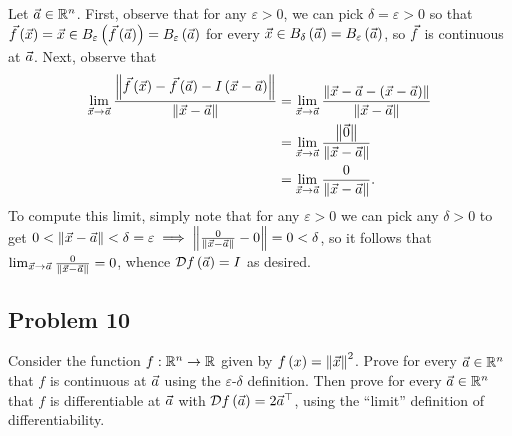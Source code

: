 \documentclass[main.tex]{subfiles}
\begin{document}
\begin{soln}
    Let $\vec{a}\in \mathbb R^n$. First, observe that for any $\varepsilon > 0$, we can pick $\delta = \varepsilon > 0$ so that $\vec{f}\left( \vec{x} \right) = \vec{x}\in B_\varepsilon\left( \vec{f}\left( \vec{a} \right) \right) = B_\varepsilon\left( \vec{a} \right)$ for every $\vec{x}\in B_\delta\left( \vec{a} \right) = B_\varepsilon\left( \vec{a} \right)$, so $\vec{f}$ is continuous at $\vec{a}$. Next, observe that
    \begin{align*}
    \lim_{\vec{x}\to \vec{a}} \frac{\left\lVert \vec{f}\left( \vec{x} \right) - \vec{f}\left( \vec{a} \right) - I\left( \vec{x} - \vec{a} \right) \right\rVert}{\left\lVert \vec{x} - \vec{a} \right\rVert} &= \lim_{\vec{x}\to \vec{a}} \frac{\left\lVert \vec{x} - \vec{a} - \left( \vec{x} - \vec{a} \right) \right\rVert}{\left\lVert \vec{x} - \vec{a} \right\rVert} \\
    &= \lim_{\vec{x}\to \vec{a}} \frac{\left\lVert \vec{0} \right\rVert}{\left\lVert \vec{x} - \vec{a} \right\rVert} \\
    &= \lim_{\vec{x}\to \vec{a}} \frac{0}{\left\lVert \vec{x} - \vec{a} \right\rVert}.
    \end{align*}
    To compute this limit, simply note that for any $\varepsilon > 0$ we can pick any $\delta > 0$ to get $0 < \left\lVert \vec{x} - \vec{a} \right\rVert < \delta = \varepsilon \implies \left\lVert \frac{0}{\left\lVert \vec{x} - \vec{a} \right\rVert} - 0 \right\rVert = 0 < \delta$, so it follows that $\lim_{\vec{x}\to \vec{a}} \frac{0}{\left\lVert \vec{x} - \vec{a} \right\rVert} = 0$, whence $\mathcal{D}f\left( \vec{a} \right) = I$ as desired.
\end{soln}
\eject

\subsection{Problem 10}
\begin{claim}
    Consider the function $f : \mathbb R^n \to \mathbb R$ given by $f\left( x \right) = \left\lVert \vec{x} \right\rVert^2$. Prove for every $\vec{a} \in \mathbb R^n$ that $f$ is continuous at $\vec{a}$ using the $\varepsilon$-$\delta$ definition. Then prove for every $\vec{a} \in \mathbb R^n$ that $f$ is differentiable at $\vec{a}$ with $\mathcal{D}f\left( \vec{a} \right) = 2\vec{a}^\top$, using the “limit” definition of differentiability.
\end{claim}
\end{document}
